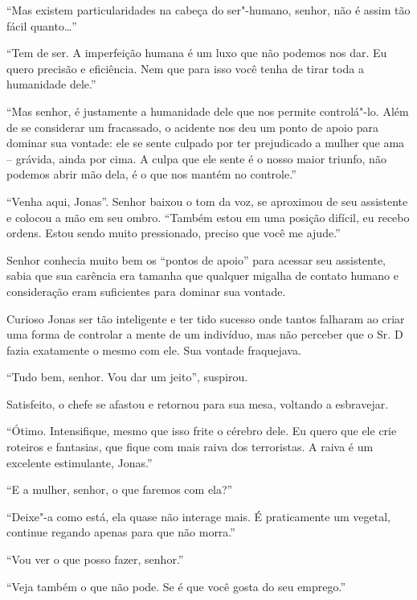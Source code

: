 ``Mas existem particularidades na cabeça do ser"-humano, senhor, não é
assim tão fácil quanto\ldots{}''

``Tem de ser. A imperfeição humana é um luxo que não podemos nos dar. Eu
quero precisão e eficiência. Nem que para isso você tenha de tirar toda
a humanidade dele.''

``Mas senhor, é justamente a humanidade dele que nos permite
controlá"-lo. Além de se considerar um fracassado, o acidente nos deu um
ponto de apoio para dominar sua vontade: ele se sente culpado por ter
prejudicado a mulher que ama -- grávida, ainda por cima. A culpa que ele
sente é o nosso maior triunfo, não podemos abrir mão dela, é o que nos
mantém no controle.''

``Venha aqui, Jonas''. Senhor  baixou o
tom da voz, se aproximou de seu
assistente e colocou a mão em seu ombro. ``Também estou em uma posição
difícil, eu recebo ordens. Estou sendo muito pressionado, preciso que
você me ajude.''

Senhor  conhecia muito bem os ``pontos de apoio'' para acessar seu
assistente, sabia que sua carência era tamanha que qualquer migalha de
contato humano e consideração eram suficientes para dominar sua vontade.

Curioso Jonas ser tão inteligente e ter tido sucesso onde tantos
falharam ao criar uma forma de controlar a mente de um indivíduo, mas
não perceber que o Sr. D fazia exatamente o mesmo com ele. Sua vontade
fraquejava.

``Tudo bem, senhor. Vou dar um jeito'', suspirou.

Satisfeito, o chefe se afastou e retornou para sua mesa, voltando a
esbravejar.

``Ótimo. Intensifique, mesmo que isso frite o cérebro dele. Eu quero que
ele crie roteiros e fantasias, que fique com mais raiva dos terroristas.
A raiva é um excelente estimulante, Jonas.''

``E a mulher, senhor, o que faremos com ela?''

``Deixe"-a como está, ela quase não interage mais. É praticamente um
vegetal, continue regando apenas para que não morra.''

``Vou ver o que posso fazer, senhor.''

``Veja também o que não pode. Se é que você gosta do seu emprego.''

\asterisc


